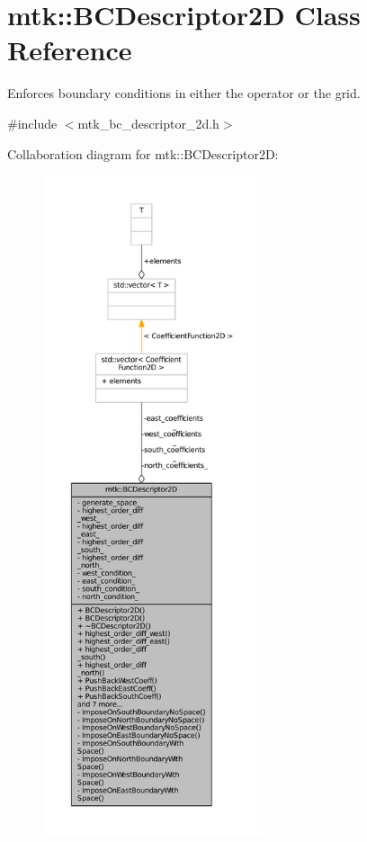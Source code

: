 \hypertarget{classmtk_1_1BCDescriptor2D}{\section{mtk\+:\+:B\+C\+Descriptor2\+D Class Reference}
\label{classmtk_1_1BCDescriptor2D}
}


Enforces boundary conditions in either the operator or the grid.  




{\ttfamily \#include $<$mtk\+\_\+bc\+\_\+descriptor\+\_\+2d.\+h$>$}



Collaboration diagram for mtk\+:\+:B\+C\+Descriptor2\+D\+:
\nopagebreak
\begin{figure}[H]
\begin{center}
\leavevmode
\includegraphics[height=550pt]{classmtk_1_1BCDescriptor2D__coll__graph}
\end{center}
\end{figure}
